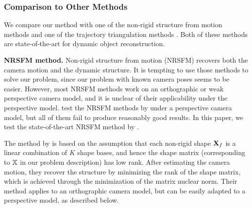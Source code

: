 
 
\subsubsection{Comparison to Other Methods}
We compare our method with one of the non-rigid structure from motion methods \cite{dai2014simple} and one of the trajectory triangulation methods \cite{Valmadre_CVPR2012}. Both of these methods are state-of-the-art for dynamic object reconstruction.

\textbf{NRSFM method.} Non-rigid structure from motion (NRSFM) recovers both the camera motion and the dynamic structure. It is tempting to use those methods to solve our problem, since our problem with known camera poses seems to be easier. 
However, most NRSFM methods work on an orthographic or weak perspective camera model, and it is unclear of their applicability under the perspective model. \citet{Park_ECCV2010} test the NRSFM methods by \citet{Akhter_NIPS08,torresani2008nonrigid,paladini2009factorization} under a perspective camera model, but all of them fail to produce reasonably good results. In this paper, we test the state-of-the-art NRSFM method by \citet{dai2014simple}.

The method by \citet{dai2014simple} is based on the assumption that each non-rigid shape $\mathbf X_f$ is a linear combination of $K$ shape bases, and hence the shape matrix (corresponding to $\mathbb X$ in our problem description) has low rank.
After estimating the camera motion,  they recover the structure by minimizing the rank of the shape matrix, which is achieved through the minimization of the matrix nuclear norm.  Their method applies to an orthographic camera model, but can be easily adapted to a perspective model, as described below. 

